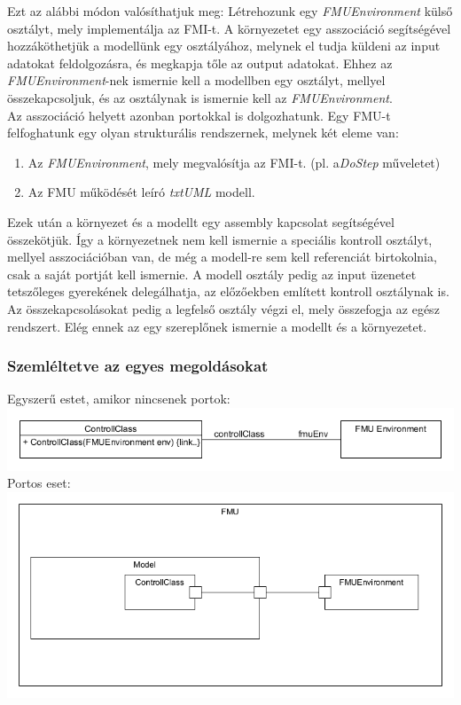 \documentclass[a4paper,12pt]{report}
\begin{document}
Ezt az alábbi módon valósíthatjuk meg: Létrehozunk egy \textit{FMUEnvironment} külső osztályt, mely implementálja az FMI-t. A környezetet egy asszociáció segítségével hozzáköthetjük a modellünk egy osztályához,  melynek el tudja küldeni az input adatokat feldolgozásra, és megkapja tőle az output adatokat. Ehhez az \textit{FMUEnvironment}-nek ismernie kell a modellben egy osztályt, mellyel összekapcsoljuk, és az osztálynak is ismernie kell az \textit{FMUEnvironment}.   \\
Az asszociáció helyett azonban portokkal is dolgozhatunk. Egy FMU-t felfoghatunk egy olyan strukturális rendszernek, melynek két eleme van:
\begin{enumerate}
\item Az \textit{FMUEnvironment}, mely megvalósítja az FMI-t. (pl. a\textit{DoStep} műveletet)
\item Az FMU működését leíró \textit{txtUML} modell.
\end{enumerate}
Ezek után a környezet és a modellt egy assembly kapcsolat segítségével összekötjük. Így a környezetnek nem kell ismernie a speciális kontroll osztályt, mellyel asszociációban van, de még a modell-re sem kell referenciát birtokolnia, csak a saját portját kell ismernie. A modell osztály pedig az input üzenetet tetszőleges gyerekének delegálhatja, az előzőekben említett kontroll osztálynak is. Az összekapcsolásokat pedig a legfelső osztály végzi el, mely összefogja az egész rendszert. Elég ennek az egy szereplőnek ismernie a modellt és a környezetet.  \\

\subsubsection{Szemléltetve az egyes megoldásokat}

Egyszerű estet, amikor nincsenek portok: \\
\includegraphics[scale=0.6]{fmu_simple.png} \\

Portos eset: \\
\includegraphics[scale=0.6]{fmu_with_ports.png} \\
\end{document}
